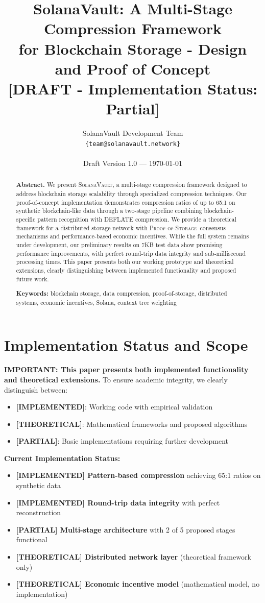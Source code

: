 \documentclass[11pt,a4paper]{article}
\title{%
    \Large \textbf{SolanaVault: A Multi-Stage Compression Framework} \\
    \large \textbf{for Blockchain Storage - Design and Proof of Concept} \\
    \normalsize \textbf{[DRAFT - Implementation Status: Partial]}
}
\author{
    SolanaVault Development Team\\
    \texttt{\{team@solanavault.network\}}\\
    \\
    \small Draft Version 1.0 --- \today
}
\date{}
\newcommand{\SolanaVault}{\textsc{SolanaVault}}
\newcommand{\ProofOfStorage}{\textsc{Proof-of-Storage}}
\begin{document}
\maketitle

\begin{abstract}
\textbf{Abstract.} We present \SolanaVault, a multi-stage compression framework designed to address blockchain storage scalability through specialized compression techniques. Our proof-of-concept implementation demonstrates compression ratios of up to 65:1 on synthetic blockchain-like data through a two-stage pipeline combining blockchain-specific pattern recognition with DEFLATE compression. We provide a theoretical framework for a distributed storage network with \ProofOfStorage\ consensus mechanisms and performance-based economic incentives. While the full system remains under development, our preliminary results on 7KB test data show promising performance improvements, with perfect round-trip data integrity and sub-millisecond processing times. This paper presents both our working prototype and theoretical extensions, clearly distinguishing between implemented functionality and proposed future work.

\textbf{Keywords:} blockchain storage, data compression, proof-of-storage, distributed systems, economic incentives, Solana, context tree weighting
\end{abstract}

\section{Implementation Status and Scope}
\label{sec:status}

\textbf{IMPORTANT: This paper presents both implemented functionality and theoretical extensions.} To ensure academic integrity, we clearly distinguish between:

\begin{itemize}
\item \textbf{[IMPLEMENTED]}: Working code with empirical validation
\item \textbf{[THEORETICAL]}: Mathematical frameworks and proposed algorithms
\item \textbf{[PARTIAL]}: Basic implementations requiring further development
\end{itemize}

\textbf{Current Implementation Status:}
\begin{itemize}
\item \textbf{[IMPLEMENTED] Pattern-based compression} achieving 65:1 ratios on synthetic data
\item \textbf{[IMPLEMENTED] Round-trip data integrity} with perfect reconstruction
\item \textbf{[PARTIAL] Multi-stage architecture} with 2 of 5 proposed stages functional
\item \textbf{[THEORETICAL] Distributed network layer} (theoretical framework only)
\item \textbf{[THEORETICAL] Economic incentive model} (mathematical model, no implementation)
\end{itemize}
\end{document}
